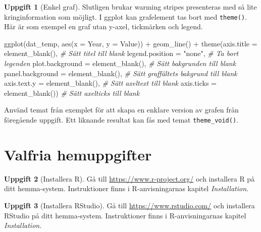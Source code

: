 \documentclass[
]{book}
\newenvironment{Shaded}{\begin{snugshade}}{\end{snugshade}}
\newcommand{\AttributeTok}[1]{\textcolor[rgb]{0.77,0.63,0.00}{#1}}
\newcommand{\CommentTok}[1]{\textcolor[rgb]{0.56,0.35,0.01}{\textit{#1}}}
\newcommand{\FunctionTok}[1]{\textcolor[rgb]{0.00,0.00,0.00}{#1}}
\newcommand{\NormalTok}[1]{#1}
\newcommand{\SpecialCharTok}[1]{\textcolor[rgb]{0.00,0.00,0.00}{#1}}
\newcommand{\StringTok}[1]{\textcolor[rgb]{0.31,0.60,0.02}{#1}}
\theoremstyle{definition}
\theoremstyle{definition}
\theoremstyle{definition}
\newtheorem{exercise}{Uppgift}[chapter]
\theoremstyle{definition}
\theoremstyle{remark}
\begin{document}
\begin{exercise}[Enkel graf]
Slutligen brukar warming stripes presenteras med så lite kringinformation som möjligt. I ggplot kan grafelement tas bort med \texttt{theme()}. Här är som exempel en graf utan y-axel, tickmärken och legend.

\begin{Shaded}
\begin{Highlighting}[]
\FunctionTok{ggplot}\NormalTok{(dat\_temp, }\FunctionTok{aes}\NormalTok{(}\AttributeTok{x =}\NormalTok{ Year, }\AttributeTok{y =}\NormalTok{ Value)) }\SpecialCharTok{+}
  \FunctionTok{geom\_line}\NormalTok{() }\SpecialCharTok{+}
  \FunctionTok{theme}\NormalTok{(}\AttributeTok{axis.title =} \FunctionTok{element\_blank}\NormalTok{(),            }\CommentTok{\# Sätt titel till blank}
        \AttributeTok{legend.position =} \StringTok{"none"}\NormalTok{,                }\CommentTok{\# Ta bort legenden}
        \AttributeTok{plot.background =} \FunctionTok{element\_blank}\NormalTok{(),       }\CommentTok{\# Sätt bakgrunden till blank}
        \AttributeTok{panel.background =} \FunctionTok{element\_blank}\NormalTok{(),      }\CommentTok{\# Sätt graffältets bakgrund till blank}
        \AttributeTok{axis.text.y =} \FunctionTok{element\_blank}\NormalTok{(),           }\CommentTok{\# Sätt axeltext till blank}
        \AttributeTok{axis.ticks =} \FunctionTok{element\_blank}\NormalTok{())            }\CommentTok{\# Sätt axelticks till blank}
\end{Highlighting}
\end{Shaded}

Använd temat från exemplet för att skapa en enklare version av grafen från föregående uppgift. Ett liknande resultat kan fås med temat \texttt{theme\_void()}.
\end{exercise}

\hypertarget{valfria-hemuppgifter}{%
\section{Valfria hemuppgifter}\label{valfria-hemuppgifter}}

\begin{exercise}[Installera R]
Gå till \url{https://www.r-project.org/} och installera R på ditt hemma-system. Instruktioner finns i R-anvisningarnas kapitel \emph{Installation}.
\end{exercise}

\begin{exercise}[Installera RStudio]
Gå till \url{https://www.rstudio.com/} och installera RStudio på ditt hemma-system. Instruktioner finns i R-anvisningarnas kapitel \emph{Installation}.
\end{exercise}
\end{document}
